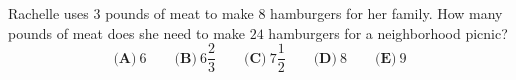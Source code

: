 Rachelle uses $3$ pounds of meat to make $8$ hamburgers for her family. How many pounds of meat does she need to make $24$ hamburgers for a neighborhood picnic?
\[\textbf{(A)}\ 6\qquad\textbf{(B)}\ 6\dfrac23\qquad\textbf{(C)}\ 7\dfrac12\qquad\textbf{(D)}\ 8\qquad\textbf{(E)}\ 9\]
